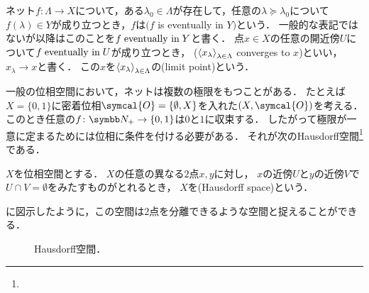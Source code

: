 \documentclass{ltjsbook}
\begin{document}
\begin{thmbox}
\begin{definition}
ネット\(f\colon \Lambda \to X\)について，ある\(\lambda_0 \in \Lambda\)が存在して，任意の\(\lambda \succeq \lambda_0\)について\(f(\lambda) \in Y\)が成り立つとき，\(f\)は\((f\) is eventually in \(Y)\)という．
一般的な表記ではないが以降はこのことを\(f \mathrel{\text{eventually in}} Y\)と書く．
点\(x \in X\)の任意の開近傍\(U\)について\(f \mathrel{\text{eventually in}} U\)が成り立つとき，
(\({\langle {x}_\lambda \rangle}_{\lambda \in \Lambda}\) converges to \(x\))といい，\(x_\lambda \to x\)と書く．
この\(x\)を\({\langle {x}_\lambda \rangle}_{\lambda \in \Lambda}\)の(limit point)という．
\end{definition}
\end{thmbox}

一般の位相空間において，ネットは複数の極限をもつことがある．
たとえば\(X = \{0, 1\}\)に密着位相\(\symcal{O} = \{\emptyset, X\}\)を入れた\(\tuple{X, \symcal{O}}\)を考える．
このとき任意の\(f\colon \PositiveInteger \to \{0, 1\}\)は\(0\)と\(1\)に収束する．
したがって極限が一意に定まるためには位相に条件を付ける必要がある．
それが次のHausdorff空間\footnote{}である．

\begin{thmbox}
\begin{definition}
\(X\)を位相空間とする．
\(X\)の任意の異なる\(2\)点\(x, y\)に対し，
\(x\)の近傍\(U\)と\(y\)の近傍\(V\)で\(U \cap V = \emptyset\)をみたすものがとれるとき，
\(X\)を(Hausdorff space)という．
\end{definition}
\end{thmbox}

に図示したように，この空間は\(2\)点を分離できるような空間と捉えることができる．

\begin{figure}
    \centering
    \caption{Hausdorff空間．}
\end{figure}
\end{document}
